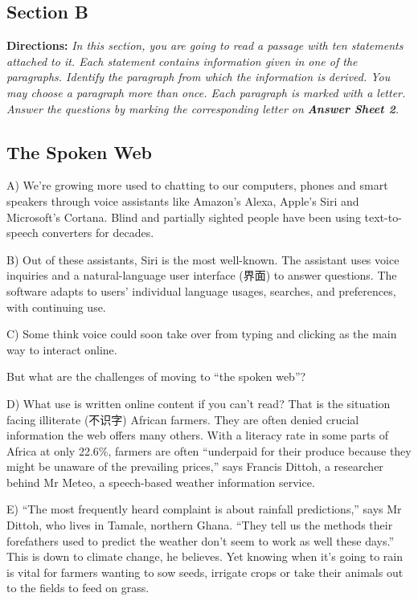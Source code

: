 \documentclass[UTF8,11pt]{ctexart}
\begin{document}
\subsection*{\textbf{Section B}}


\textbf{Directions:} \textit{In this section, you are going to read a passage with ten statements attached to it. Each statement} \textit{contains information given in one of the paragraphs. Identify the paragraph from which the information is} \textit{derived. You may choose a paragraph more than once. Each paragraph is marked with a letter. Answer the} \textit{questions by marking the corresponding letter on }\textbf{\textit{Answer Sheet 2}}\textit{.}


\subsection*{\textbf{The Spoken Web}}


A) We’re growing more used to chatting to our computers, phones and smart speakers through voice assistants like Amazon’s Alexa, Apple’s Siri and Microsoft’s Cortana. Blind and partially sighted people have been using text-to-speech converters for decades.


B) Out of these assistants, Siri is the most well-known. The assistant uses voice inquiries and a natural-language user interface (界面) to answer questions. The software adapts to users’ individual language usages, searches, and preferences, with continuing use.


C) Some think voice could soon take over from typing and clicking as the main way to interact online.


But what are the challenges of moving to “the spoken web”?


D) What use is written online content if you can’t read? That is the situation facing illiterate (不识字) African farmers. They are often denied crucial information the web offers many others. With a literacy rate in some parts of Africa at only 22.6\%, farmers are often “underpaid for their produce because they might be unaware of the prevailing prices,” says Francis Dittoh, a researcher behind Mr Meteo, a speech-based weather information service.


E) “The most frequently heard complaint is about rainfall predictions,” says Mr Dittoh, who lives in Tamale, northern Ghana. “They tell us the methods their forefathers used to predict the weather don’t seem to work as well these days.” This is down to climate change, he believes. Yet knowing when it’s going to rain is vital for farmers wanting to sow seeds, irrigate crops or take their animals out to the fields to feed on grass.
\end{document}
